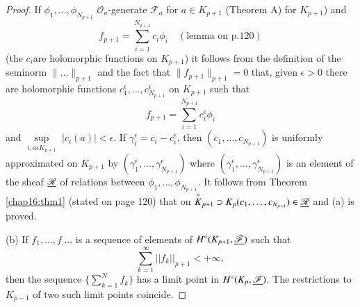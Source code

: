 \begin{proof}
If $\phi_1, \ldots, \phi_{N_{p+1}}$ $\mathscr{O}_a$-generate
$\mathscr{F}_a$ for $a \in K_{p+1}$ (Theorem A) for $K_{p+1}$) and 
$$
f_{p+1} = \sum\limits^{N_{p+1}}_{i=1} c_i \phi_i \quad (\mbox{lemma on
p.120})
$$
(the $c_i$\pageoriginale are holomorphic functions on $K_{p+1}$) it
follows from the definition of the seminorm $\|\ldots \|_{p+1}$ and
the fact that $\|f_{p+1} \|_{p+1} = 0$ that, given $\epsilon >0$ there are
holomorphic functions $c^\epsilon_1, \ldots, c^\epsilon_{N_{p+1}}$ on $K_{p+1}$
such that 
$$
f_{p+1} = \sum\limits^{N_{p+1}}_{i=1} c^\epsilon_{i} \phi_i 
$$
and $\sup\limits_{i, a \epsilon K_{p+1}}$ $|c_i(a)| < \epsilon$. If
$\gamma^\epsilon_{i} = c_i - c^\epsilon_i$, then $(c_1, \ldots, c_{N_{p+1}})$ is
uniformly approximated on $K_{p+1}$ by $(\gamma^\epsilon_1, \ldots,
\gamma^\epsilon_{N_{p+1}})$ where $(\gamma^\epsilon_1, \ldots,
\gamma^\epsilon_{N_{p+1}})$ is an element of the sheaf $\underline{\mathscr{R}}$ of
relations between $\phi_1, \ldots, \phi_{N_{p+1}}$. It follows from
Theorem \ref{chap16:thm1} (stated on page 120) that on $\overset{\circ}{K}_{p+1}
\supset K_p  (c_1, \ldots, c_{N_{p+1}}) \in \underline{\mathscr{R}}$ and (a)
is proved. 

(b) If $f_1, \ldots , f_, \ldots$ is a sequence of elements of
$H^\circ (K_{p+1}, \underline{\mathscr{F}})$ such that
$$
\sum\limits^\infty_{k=1} || f_k ||_{p+1} < + \infty, 
$$
then the sequence $\{\sum\limits^N_{k=1} f_k\}$ has a limit point in
$H^\circ (K_p, \underline{\mathscr{F}})$. The restrictions to $K_{p-1}$ of two
such limit points coincide.
\end{proof}

